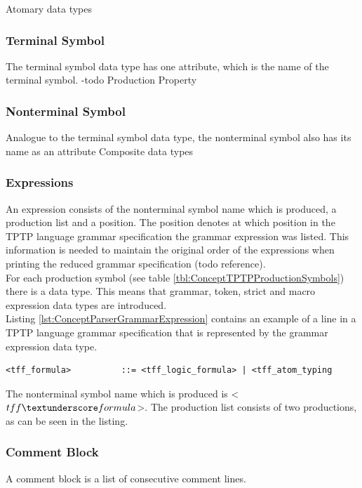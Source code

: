 Atomary data types

\subsubsection{Terminal Symbol}
The terminal symbol data type has one attribute, which is the name of the terminal symbol.
-todo Production Property

\subsubsection{Nonterminal Symbol}
Analogue to the terminal symbol data type, the nonterminal symbol also has its name as an attribute
Composite data types

\subsubsection{Expressions}
An expression consists of the nonterminal symbol name which is produced, a production list and a position.
The position denotes at which position in the \ac{TPTP} language grammar specification the grammar expression was listed.
This information is needed to maintain the original order of the expressions when printing the reduced grammar specification (todo reference).\\
For each production symbol (see table \ref{tbl:ConceptTPTPProductionSymbols}) there is a data type. This means that grammar, token, strict and macro expression data types are introduced.\\
Listing \ref{lst:ConceptParserGrammarExpression} contains an example of a line in a \ac{TPTP} language grammar specification that is represented by the grammar expression data type.
\begin{lstlisting}[basicstyle=\scriptsize	,caption= Example of a grammar expression,label= lst:ConceptParserGrammarExpression]
<tff_formula>          ::= <tff_logic_formula> | <tff_atom_typing
\end{lstlisting}
The nonterminal symbol name which is produced is <$tff \textunderscore formula$>.  The production list consists of two productions, as can be seen in the listing.
\subsubsection{Comment Block}
A comment block is a list of consecutive comment lines.

